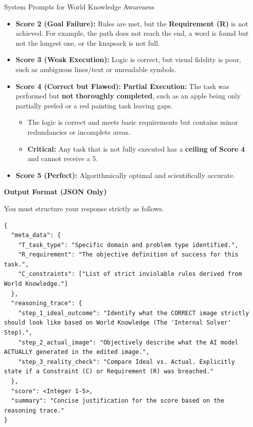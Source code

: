 \documentclass{llmxive}
\begin{document}
\begin{promptbox}[label={System Prompts: WA}]{System Prompts for World Knowledge Awareness}
\begin{itemize}[leftmargin=2.2em, labelsep=0.5em, itemsep=2pt]
    \item \textbf{Score 2 (Goal Failure):} Rules are met, but the \textbf{Requirement (R)} is not achieved. For example, the path does not reach the end, a word is found but not the longest one, or the knapsack is not full.
    
    \item \textbf{Score 3 (Weak Execution):} Logic is correct, but visual fidelity is poor, such as ambiguous lines/text or unreadable symbols.
    
    \item \textbf{Score 4 (Correct but Flawed):} \textbf{Partial Execution:} The task was performed but \textbf{not thoroughly completed}, such as an apple being only partially peeled or a red painting task leaving gaps.
    
    \begin{itemize}[leftmargin=2.2em, labelsep=0.5em, itemsep=2pt]
        \item The logic is correct and meets basic requirements but contains minor redundancies or incomplete areas.
        
        \item \textbf{Critical:} Any task that is not fully executed has a \textbf{ceiling of Score 4} and cannot receive a 5.
    \end{itemize}
    
    \item \textbf{Score 5 (Perfect):} Algorithmically optimal and scientifically accurate.
\end{itemize}

\medskip

\textbf{Output Format (JSON Only)}

You must structure your response strictly as follows.

\begin{lstlisting}
{
  "meta_data": {
    "T_task_type": "Specific domain and problem type identified.",
    "R_requirement": "The objective definition of success for this task.",
    "C_constraints": ["List of strict inviolable rules derived from World Knowledge."]
  },
  "reasoning_trace": {
    "step_1_ideal_outcome": "Identify what the CORRECT image strictly should look like based on World Knowledge (The 'Internal Solver' Step).",
    "step_2_actual_image": "Objectively describe what the AI model ACTUALLY generated in the edited image.",
    "step_3_reality_check": "Compare Ideal vs. Actual. Explicitly state if a Constraint (C) or Requirement (R) was breached."
  },
  "score": <Integer 1-5>,
  "summary": "Concise justification for the score based on the reasoning trace."
}
\end{lstlisting}

\end{promptbox}
\end{document}
